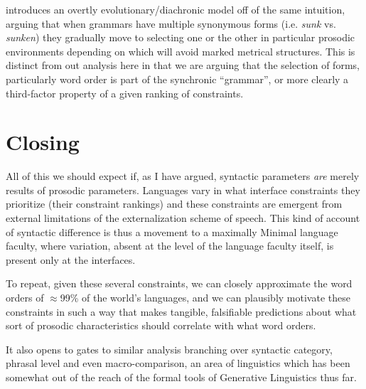 \documentclass{article}
\begin{document}
\textcite{schluter15} introduces an overtly evolutionary/diachronic model off of the same intuition, arguing that when grammars have multiple synonymous forms (i.e. \emph{sunk} vs. \emph{sunken}) they gradually move to selecting one or the other in particular prosodic environments depending on which will avoid marked metrical structures.
This is distinct from out analysis here in that we are arguing that the selection of forms, particularly word order is part of the synchronic ``grammar'', or more clearly a third-factor property of a given ranking of constraints.

\section{Closing}

All of this we should expect if, as I have argued, syntactic parameters \emph{are} merely results of prosodic parameters.
Languages vary in what interface constraints they prioritize (their constraint rankings) and these constraints are emergent from external limitations of the externalization scheme of speech.
This kind of account of syntactic difference is thus a movement to a maximally Minimal language faculty, where variation, absent at the level of the language faculty itself, is present only at the interfaces.

To repeat, given these several constraints, we can closely approximate the word orders of $\approx$99\% of the world's languages, and we can plausibly motivate these constraints in such a way that makes tangible, falsifiable predictions about what sort of prosodic characteristics should correlate with what word orders.

It also opens to gates to similar analysis branching over syntactic category, phrasal level and even macro-comparison, an area of linguistics which has been somewhat out of the reach of the formal tools of Generative Linguistics thus far.

\printbibliography
\end{document}
